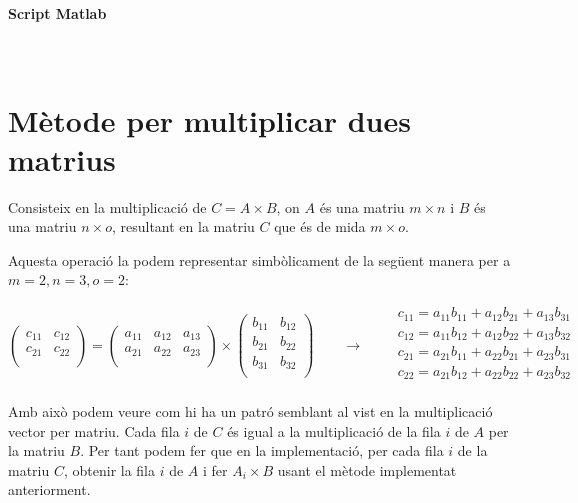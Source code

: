 \documentclass[11pt,a4paper,twoside]{report}
\begin{document}
\paragraph*{Script Matlab} \mbox{} \\



\section{Mètode per multiplicar dues matrius}

Consisteix en la multiplicació de $C = A \times B$, on $A$ és una matriu $m \times n$ i $B$ és una matriu $n \times o$, resultant en la matriu $C$ que és de mida $m \times o$. 

Aquesta operació la podem representar simbòlicament de la següent manera per a $m = 2, n = 3, o = 2$: 

\[
\begin{pmatrix}
		  	c_{11}	&	c_{12}	\\
		  	c_{21}	&	c_{22}	\\
\end{pmatrix} = 
\begin{pmatrix}
		  	a_{11}	&	a_{12} & a_{13}\\
		  	a_{21}	&	a_{22} & a_{23}\\
\end{pmatrix} \times
\begin{pmatrix}
		  	b_{11}	&	b_{12}	\\
		  	b_{21}	&	b_{22}	\\
		  	b_{31}	&	b_{32}	\\
\end{pmatrix} \qquad \longrightarrow \qquad
\begin{matrix} 
c_{11} = a_{11}b_{11} + a_{12}b_{21} + a_{13}b_{31} \\
c_{12} = a_{11}b_{12} + a_{12}b_{22} + a_{13}b_{32} \\
c_{21} = a_{21}b_{11} + a_{22}b_{21} + a_{23}b_{31}	\\
c_{22} = a_{21}b_{12} + a_{22}b_{22} + a_{23}b_{32} \\
\end{matrix}
\]

Amb això podem veure com hi ha un patró semblant al vist en la multiplicació vector per matriu. Cada fila $i$ de $C$ és igual a la multiplicació de la fila $i$ de $A$ per la matriu $B$. Per tant podem fer que en la implementació, per cada fila $i$ de la matriu $C$, obtenir la fila $i$ de $A$ i fer $A_i \times B$ usant el mètode implementat anteriorment.
\end{document}
